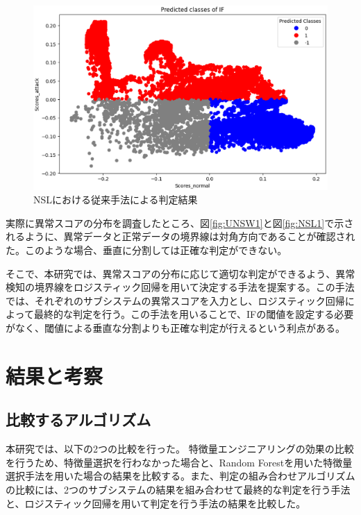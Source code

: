 \documentclass{css}
\begin{document}
\begin{figure}[ht]
    \centering
    \includegraphics[width=\linewidth]{pictures/eps/NSL2.eps}
    \caption{NSLにおける従来手法による判定結果}
    \label{fig:NSL2}
\end{figure}

実際に異常スコアの分布を調査したところ、図\ref{fig:UNSW1}と図\ref{fig:NSL1}で示されるように、異常データと正常データの境界線は対角方向であることが確認された。このような場合、垂直に分割しては正確な判定ができない。

そこで、本研究では、異常スコアの分布に応じて適切な判定ができるよう、異常検知の境界線をロジスティック回帰を用いて決定する手法を提案する。この手法では、それぞれのサブシステムの異常スコアを入力とし、ロジスティック回帰によって最終的な判定を行う。この手法を用いることで、IFの閾値を設定する必要がなく、閾値による垂直な分割よりも正確な判定が行えるという利点がある。

\section{結果と考察}

\subsection{比較するアルゴリズム}

本研究では、以下の2つの比較を行った。
特徴量エンジニアリングの効果の比較を行うため、特徴量選択を行わなかった場合と、Random Forestを用いた特徴量選択手法を用いた場合の結果を比較する。また、判定の組み合わせアルゴリズムの比較には、2つのサブシステムの結果を組み合わせて最終的な判定を行う手法と、ロジスティック回帰を用いて判定を行う手法の結果を比較した。
\end{document}
